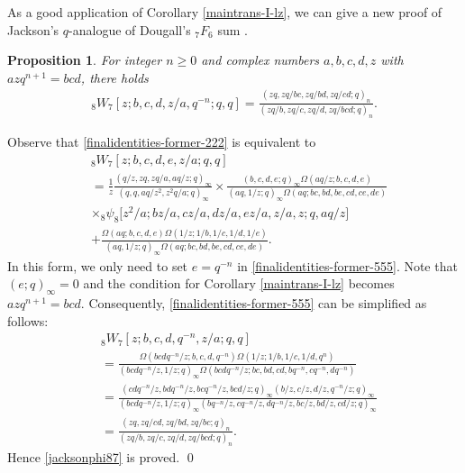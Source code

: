 \documentclass[xits,review,sort&compress]{elsarticle}
\newtheorem{xinzhi}[dl]{Proposition}
\numberwithin{equation}{section}
\newcommand{\poq}[2]{(#1;q)_{#2}}
\def\pf{\noindent {\it Proof.} }
\begin{document}
As a good application of Corollary \ref{maintrans-I-lz}, we can give a new proof of Jackson's $q$-analogue of Dougall's $_{7} F_{6}$ sum  \cite[(II. 22)]{10}.
\begin{xinzhi} For integer $n\geq 0$ and complex numbers $a,b,c,d,z$ with $azq^{n+1}=bcd$, there holds
\begin{align}
{}_{8} W_{7}[z ; b, c, d, z/a, q^{-n}; q, q ]
=\frac{\poq{zq,zq/bc,zq/bd,zq/cd}{n}}{\poq{zq/b,zq/c,zq/d,zq/bcd}{n}}.\label{jacksonphi87}
\end{align}
\end{xinzhi}
\pf  Observe that  \eqref{finalidentities-former-222} is equivalent to
\begin{align}
 &{}_{8} W_{7}[z ; b, c, d, e, z / a; q, q ] \nonumber\\
 &=\frac{1}{z}\frac{\poq{q/z,zq,zq/a,aq/z}{\infty}}{\left(q,q,aq/z^2,z^2q/a;q\right)_{\infty}}
\times\frac{(b, c, d, e; q)_{\infty}\Omega(aq/z;b,c,d,e)}{(aq,1/z; q)_{\infty}\Omega(aq;bc,bd,be,cd,ce,de)}\nonumber
\\ &\times {}_{8}\psi_{8}\big[z^2/a;bz/a,cz/a,dz/a,
ez/a,z/a,z;q,aq/z\big]\nonumber\\
&+\frac{\Omega(aq;b,c,d,e)\Omega(1/z;1/b,1/c,1/d,
 1/e)}{(aq,1/z; q)_{\infty}\Omega(aq;bc,bd,be,cd,ce,de)}.\label{finalidentities-former-555}
\end{align}
In this form, we only need to set $e=q^{-n}$ in \eqref{finalidentities-former-555}. Note that
$(e;q)_\infty=0$ and the condition for Corollary \ref{maintrans-I-lz} becomes $azq^{n+1}=bcd$.  Consequently, \eqref{finalidentities-former-555} can be  simplified as follows:
\begin{align*}
&{}_{8} W_{7}[z ; b, c, d, q^{-n}, z / a; q, q ]\\
 &=\frac{\Omega(bcdq^{-n}/z;b,c,d,q^{-n})\Omega(1/z;1/b,1/c,1/d,
 q^{n})}{(bcdq^{-n}/z,1/z; q)_{\infty}\Omega(bcdq^{-n}/z;bc,bd,cd,bq^{-n},cq^{-n},dq^{-n})}\\
 &=\frac{\poq{cdq^{-n}/z,bdq^{-n}/z,bcq^{-n}/z,bcd/z}{\infty}
 \poq{b/z,c/z,d/z,q^{-n}/z}{\infty}}{(bcdq^{-n}/z,1/z; q)_{\infty}\poq{bq^{-n}/z,cq^{-n}/z,dq^{-n}/z,bc/z,bd/z,cd/z}{\infty}}\\
 &=\frac{\poq{zq,zq/cd,zq/bd,zq/bc}{n}}{\poq{zq/b,zq/c,zq/d,zq/bcd}{n}}.
\end{align*}
Hence \eqref{jacksonphi87} is proved.
\qed
\end{document}
